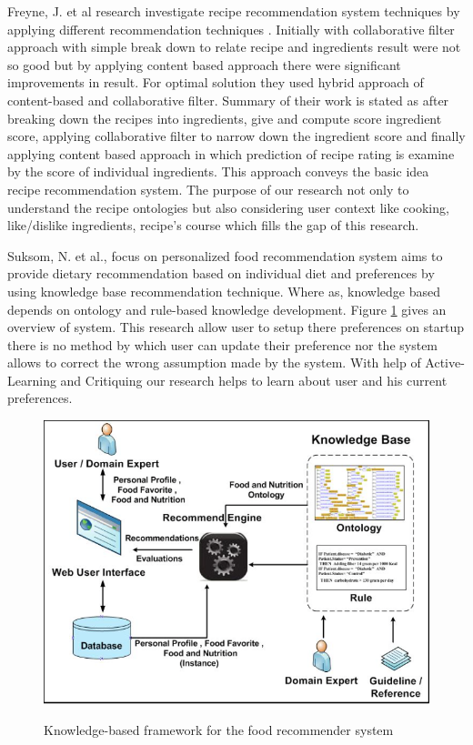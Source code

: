 Freyne, J. et al\cite{freyne2010recommending} research investigate recipe recommendation system techniques by applying different recommendation techniques \cite{freyne2010recommending}. Initially with collaborative filter approach with simple break down to relate recipe and ingredients result were not so good but by applying content based approach there were significant improvements in result. For optimal solution they used hybrid approach of content-based and collaborative filter. Summary of their work is stated as after breaking down the recipes into ingredients, give and compute score ingredient score, applying collaborative filter to narrow down the ingredient score and finally applying content based approach in which prediction of recipe rating is examine by the score of individual ingredients. This approach conveys the basic idea recipe recommendation system.  The purpose of our research not only to understand the recipe ontologies but also considering user context like cooking, like/dislike ingredients, recipe’s course which fills the gap of this research.\newline


Suksom, N. et al.\cite{suksom2010knowledge}, focus on personalized food recommendation system aims to provide dietary recommendation based on individual diet and preferences by using knowledge base recommendation technique. Where as, knowledge based depends on ontology and rule-based knowledge development. Figure \ref{fig:ch2_suksom2010knowledge} gives an overview of system. This research allow user to setup there preferences on startup there is no method by which user can update their preference nor the system allows to correct the wrong assumption made by the system. With help of Active-Learning and Critiquing our research helps to learn about user and his current preferences. 

\begin{figure}[h]
	\centering
	\includegraphics[width=.70\linewidth]{figures/ch2_suksom2010knowledge.png}
	\caption{Knowledge-based framework for the food recommender system}
	\cite{suksom2010knowledge}
	\label{fig:ch2_suksom2010knowledge}
\end{figure}


